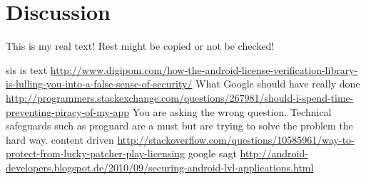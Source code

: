 \section{Discussion}\label{section:conclusion-discussion}
This is my real text! Rest might be copied or not be checked!


sis is text
\url{http://www.digipom.com/how-the-android-license-verification-library-is-lulling-you-into-a-false-sense-of-security/} What Google should have really done
\newline
\url{http://programmers.stackexchange.com/questions/267981/should-i-spend-time-preventing-piracy-of-my-app} You are asking the wrong question. Technical safeguards such as proguard are a must but are trying to solve the problem the hard way.\newline
content driven \url{http://stackoverflow.com/questions/10585961/way-to-protect-from-lucky-patcher-play-licensing}\newline
google sagt \url{http://android-developers.blogspot.de/2010/09/securing-android-lvl-applications.html}\newline
